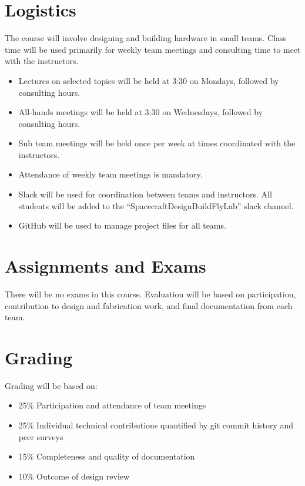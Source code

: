 \documentclass[11pt,letterpaper]{article}
\begin{document}
\section*{Logistics}

The course will involve designing and building hardware in small teams. Class time will be used primarily for weekly team meetings and consulting time to meet with the instructors.

\begin{itemize}
	\item Lectures on selected topics will be held at 3:30 on Mondays, followed by consulting hours.
	\item All-hands meetings will be held at 3:30 on Wednesdays, followed by consulting hours.
	\item Sub team meetings will be held once per week at times coordinated with the instructors.
	\item Attendance of weekly team meetings is mandatory.
	\item Slack will be used for coordination between teams and instructors. All students will be added to the ``SpacecraftDesignBuildFlyLab'' slack channel.
	\item GitHub will be used to manage project files for all teams.
\end{itemize}

\section*{Assignments and Exams}

There will be no exams in this course. Evaluation will be based on participation, contribution to design and fabrication work, and final documentation from each team.

\section*{Grading}

Grading will be based on:
\begin{itemize}
	\item 25\% Participation and attendance of team meetings
	\item 25\% Individual technical contributions quantified by git commit history and peer surveys
	\item 15\% Completeness and quality of documentation
	\item 10\% Outcome of design review
\end{itemize}
\end{document}

